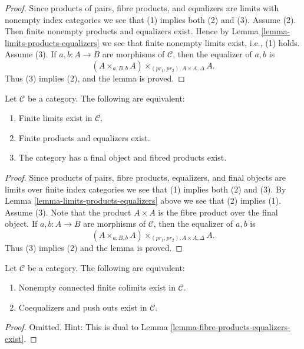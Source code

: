 \begin{proof}
Since products of pairs, fibre products, and equalizers are limits with
nonempty index categories we see that (1) implies both (2) and (3).
Assume (2). Then finite nonempty products and equalizers exist. Hence by
Lemma \ref{lemma-limits-products-equalizers}
we see that finite nonempty limits exist, i.e., (1) holds. Assume (3).
If $a, b : A \to B$ are morphisms of $\mathcal{C}$, then the
equalizer of $a, b$ is
$$
(A \times_{a, B, b} A)\times_{(pr_1, pr_2), A \times A, \Delta} A.
$$
Thus (3) implies (2), and the lemma is proved.
\end{proof}

\begin{lemma}
\label{lemma-finite-limits-exist}
Let $\mathcal{C}$ be a category.
The following are equivalent:
\begin{enumerate}
\item Finite limits exist in $\mathcal{C}$.
\item Finite products and equalizers exist.
\item The category has a final object and fibred products exist.
\end{enumerate}
\end{lemma}

\begin{proof}
Since products of pairs, fibre products, equalizers, and final objects
are limits over finite index categories we see that (1) implies both (2)
and (3). By
Lemma \ref{lemma-limits-products-equalizers}
above we see that (2) implies (1). Assume (3).
Note that the product $A \times A$ is the fibre product over the
final object. If $a, b : A \to B$ are morphisms of $\mathcal{C}$, then the
equalizer of $a, b$ is
$$
(A \times_{a, B, b} A)\times_{(pr_1, pr_2), A \times A, \Delta} A.
$$
Thus (3) implies (2) and the lemma is proved.
\end{proof}

\begin{lemma}
\label{lemma-push-outs-coequalizers-exist}
Let $\mathcal{C}$ be a category.
The following are equivalent:
\begin{enumerate}
\item Nonempty connected finite colimits exist in $\mathcal{C}$.
\item Coequalizers and push outs exist in $\mathcal{C}$.
\end{enumerate}
\end{lemma}

\begin{proof}
Omitted. Hint: This is dual to
Lemma \ref{lemma-fibre-products-equalizers-exist}.
\end{proof}

